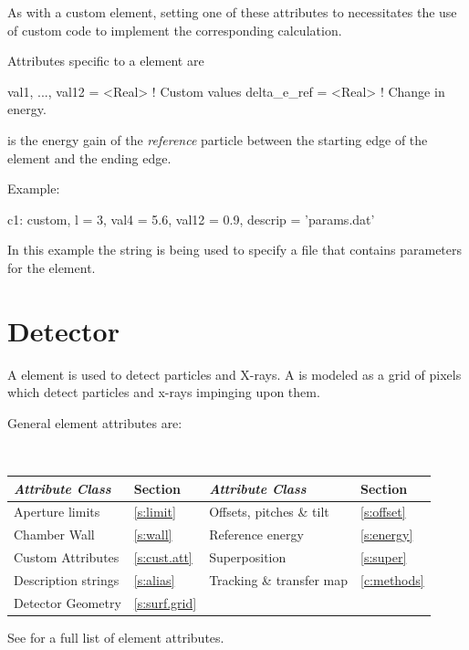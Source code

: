 As with a custom element, setting one of these attributes to
 necessitates the use of custom code to implement the
corresponding calculation.

Attributes specific to a  element are
\begin{example}
  val1, ..., val12 = <Real>  ! Custom values 
  delta_e_ref      = <Real>  ! Change in energy.
\end{example}

 is the energy gain of the {\it reference} particle
between the starting edge of the element and the ending edge.

Example:
\begin{example}
  c1: custom, l = 3, val4 = 5.6, val12 = 0.9, descrip = 'params.dat'
\end{example}
In this example the  string is being used to specify a
file that contains parameters for the element.

\section{Detector}
\label{s:detector}

A  element is used to detect particles and X-rays.  A
 is modeled as a grid of pixels which detect particles and x-rays
impinging upon them.

General  element attributes are:
\begin{center}
\tt 
\begin{tabular}{llll} \toprule
  {\sl Attribute Class}      & Section           & {\sl Attribute Class}      & Section         \\ \midrule
  Aperture limits            & \ref{s:limit}     & Offsets, pitches \& tilt   & \ref{s:offset}  \\
  Chamber Wall               & \ref{s:wall}      & Reference energy           & \ref{s:energy}  \\
  Custom Attributes          & \ref{s:cust.att}  & Superposition              & \ref{s:super}   \\
  Description strings        & \ref{s:alias}     & Tracking \& transfer map   & \ref{c:methods} \\
  Detector Geometry          & \ref{s:surf.grid} &                            &                 \\
  \bottomrule
\end{tabular}
\end{center}
\toffset
See  for a full list of element attributes.

